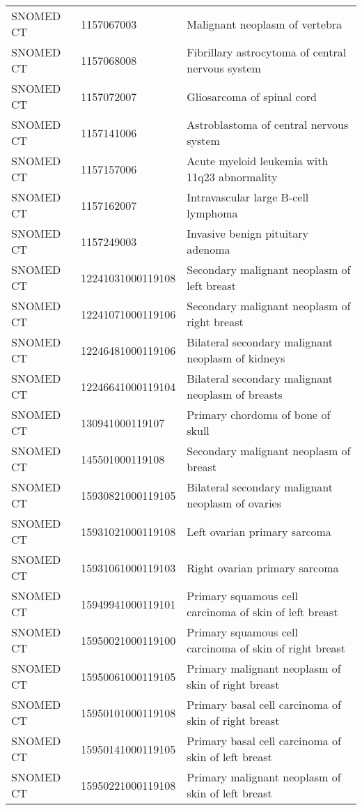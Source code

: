 \begin{longtable}{p{}p{}p{}}
  SNOMED CT & 1157067003 & Malignant neoplasm of vertebra \\ 
  SNOMED CT & 1157068008 & Fibrillary astrocytoma of central nervous system \\ 
  SNOMED CT & 1157072007 & Gliosarcoma of spinal cord \\ 
  SNOMED CT & 1157141006 & Astroblastoma of central nervous system \\ 
  SNOMED CT & 1157157006 & Acute myeloid leukemia with 11q23 abnormality \\ 
  SNOMED CT & 1157162007 & Intravascular large B-cell lymphoma \\ 
  SNOMED CT & 1157249003 & Invasive benign pituitary adenoma \\ 
  SNOMED CT & 12241031000119108 & Secondary malignant neoplasm of left breast \\ 
  SNOMED CT & 12241071000119106 & Secondary malignant neoplasm of right breast \\ 
  SNOMED CT & 12246481000119106 & Bilateral secondary malignant neoplasm of kidneys \\ 
  SNOMED CT & 12246641000119104 & Bilateral secondary malignant neoplasm of breasts \\ 
  SNOMED CT & 130941000119107 & Primary chordoma of bone of skull \\ 
  SNOMED CT & 145501000119108 & Secondary malignant neoplasm of breast \\ 
  SNOMED CT & 15930821000119105 & Bilateral secondary malignant neoplasm of ovaries \\ 
  SNOMED CT & 15931021000119108 & Left ovarian primary sarcoma \\ 
  SNOMED CT & 15931061000119103 & Right ovarian primary sarcoma \\ 
  SNOMED CT & 15949941000119101 & Primary squamous cell carcinoma of skin of left breast \\ 
  SNOMED CT & 15950021000119100 & Primary squamous cell carcinoma of skin of right breast \\ 
  SNOMED CT & 15950061000119105 & Primary malignant neoplasm of skin of right breast \\ 
  SNOMED CT & 15950101000119108 & Primary basal cell carcinoma of skin of right breast \\ 
  SNOMED CT & 15950141000119105 & Primary basal cell carcinoma of skin of left breast \\ 
  SNOMED CT & 15950221000119108 & Primary malignant neoplasm of skin of left breast \\ 

\end{longtable}
